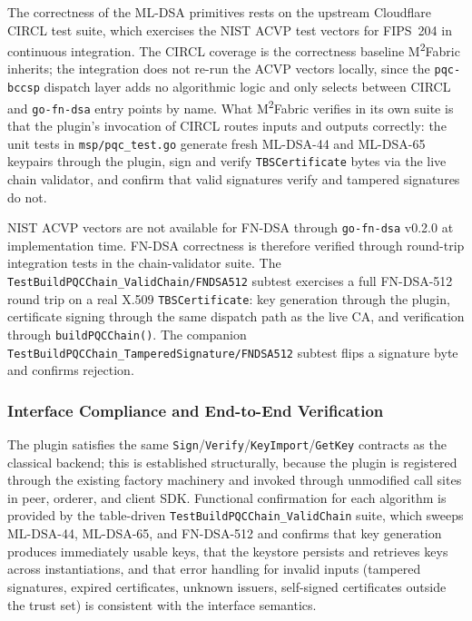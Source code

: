\documentclass{ieeetj}
\newcommand{\mfabric}{M\textsuperscript{2}Fabric}
\begin{document}
The correctness of the ML-DSA primitives rests on the upstream Cloudflare CIRCL
test suite, which exercises the NIST ACVP test vectors for FIPS~204 in
continuous integration. The CIRCL coverage is the correctness baseline
\mfabric{} inherits; the integration does not re-run the ACVP vectors locally,
since the \texttt{pqc-bccsp} dispatch layer adds no algorithmic logic and only
selects between CIRCL and \texttt{go-fn-dsa} entry points by name. What
\mfabric{} verifies in its own suite is that the plugin's invocation of CIRCL
routes inputs and outputs correctly: the unit tests in \texttt{msp/pqc\_test.go}
generate fresh ML-DSA-44 and ML-DSA-65 keypairs through the plugin, sign and
verify \texttt{TBSCertificate} bytes via the live chain validator, and confirm
that valid signatures verify and tampered signatures do not.

NIST ACVP vectors are not available for FN-DSA through \texttt{go-fn-dsa} v0.2.0
at implementation time. FN-DSA correctness is therefore verified through
round-trip integration tests in the chain-validator suite. The
\texttt{TestBuildPQCChain\_ValidChain/FNDSA512} subtest exercises a full
FN-DSA-512 round trip on a real X.509 \texttt{TBSCertificate}: key generation
through the plugin, certificate signing through the same dispatch path as the
live CA, and verification through \texttt{buildPQCChain()}. The companion
\texttt{TestBuildPQCChain\_TamperedSignature/FNDSA512} subtest flips a signature
byte and confirms rejection.

\subsubsection{Interface Compliance and End-to-End Verification}

The plugin satisfies the same \texttt{Sign}/\texttt{Verify}/\texttt{KeyImport}/\texttt{GetKey}
contracts as the classical backend; this is established structurally, because the
plugin is registered through the existing factory machinery and invoked through
unmodified call sites in peer, orderer, and client SDK. Functional confirmation
for each algorithm is provided by the table-driven
\texttt{TestBuildPQCChain\_ValidChain} suite, which sweeps ML-DSA-44, ML-DSA-65,
and FN-DSA-512 and confirms that key generation produces immediately usable keys,
that the keystore persists and retrieves keys across instantiations, and that
error handling for invalid inputs (tampered signatures, expired certificates,
unknown issuers, self-signed certificates outside the trust set) is consistent
with the interface semantics.
\end{document}
